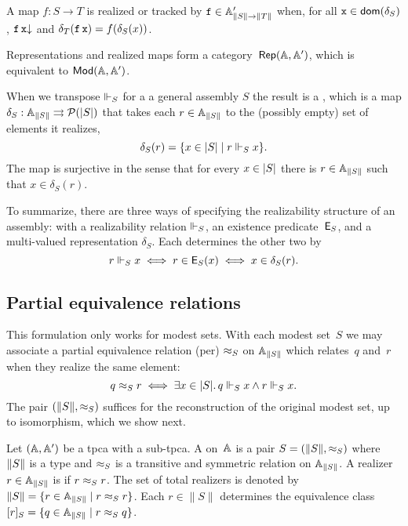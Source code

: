 A map $f : S \to T$ is realized or tracked by $\R{f} \in \subAtyp{\T{S} \to \T{T}}$ when, for all $\R{x} \in \dom{\delta_S}$, $\defined{\R{f}\,\R{x}}$ and $\delta_T(\R{f}\,\R{x}) = f(\delta_S(x))$.

Representations and realized maps form a category~$\Rep{\AA,\subAA}$, which is equivalent to $\Mod{\AA, \subAA}$.

When we transpose $\rz[S]$ for a a general assembly $S$ the result is a , which is a map $\delta_S : \xAtyp{S} \multito \pow{\S{S}}$ that takes each $r \in \xAtyp{S}$ to the (possibly empty) set of elements it realizes,
%
\begin{equation*}
  \delta_S(r) = \set{ x \in \S{S} \such r \rz[S] x}.
\end{equation*}
%
The map is surjective in the sense that for every $x \in \S{S}$ there is $r \in \xAtyp{S}$ such that $x \in \delta_S(r)$.

To summarize, there are three ways of specifying the realizability structure of an assembly: with a realizability relation $\rz[S]$, an existence predicate~$\Ex{S}$, and a multi-valued representation $\delta_S$. Each determines the other two by
%
\begin{equation*}
  r \rz[S] x \iff
  r \in \Ex{S}(x) \iff
  x \in \delta_S(r).
\end{equation*}


\subsection{Partial equivalence relations}
\label{sec:pers}

This formulation only works for modest sets. With each modest set~$S$ we may associate a partial equivalence relation (per) $\per_S$ on $\xAtyp{S}$ which relates~$q$ and~$r$ when they realize the same element:
%
\begin{equation*}
  q \per_S r \iff
  \some{x \in \S{S}} q \rz[S] x \land r \rz[S] x.
\end{equation*}
%
The pair $(\T{S}, {\per_S})$ suffices for the reconstruction of the
original modest set, up to isomorphism, which we show next.

Let $(\AA, \subAA)$ be a tpca with a sub-tpca. A  on~$\AA$ is a pair $S = (\T{S}, {\per_S})$ where
$\T{S}$ is a type and $\per_S$ is a transitive and symmetric
relation on $\xAtyp{S}$. A realizer $r \in \xAtyp{S}$ is  if
$r \per_S r$. The set of total realizers is denoted by $\|S\| = \set{r
  \in \xAtyp{S} \such r \per_S r}$. Each $r \in \|S\|$ determines
the equivalence class $[r]_S = \set{q \in \xAtyp{S} \such r \per_S q}$.

